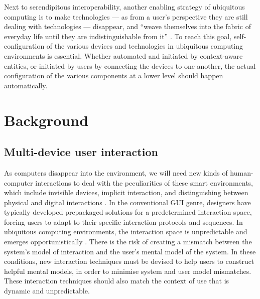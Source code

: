 Next to serendipitous interoperability, another enabling strategy of ubiquitous computing is to make technologies --- as from a user's perspective they are still dealing with technologies --- disappear, and ``weave themselves into the fabric of everyday life until they are indistinguishable from it'' \cite{Weiser1991}. To reach this goal, self-configuration of the various devices and technologies in ubiquitous computing environments is essential. Whether automated and initiated by context-aware entities, or initiated by users by connecting the devices to one another, the actual configuration of the various components at a lower level should happen automatically.

\section{Background}

\subsection{Multi-device user interaction}

As computers disappear into the environment, we will need new kinds of human-computer interactions to deal with the peculiarities of these smart environments, which include invisible devices, implicit interaction, and distinguishing between physical and digital interactions \cite{Ye2007}. In the conventional \ac{GUI} genre, designers have typically developed prepackaged solutions for a predetermined interaction space, forcing users to adapt to their specific interaction protocols and sequences. In ubiquitous computing environments, the interaction space is unpredictable and emerges opportunistically \cite{Coutaz2005a}. There is the risk of creating a mismatch between the system's model of interaction and the user's mental model of the system. In these conditions, new interaction techniques must be devised to help users to construct helpful mental models, in order to minimise system and user model mismatches. These interaction techniques should also match the context of use that is dynamic and unpredictable. 


